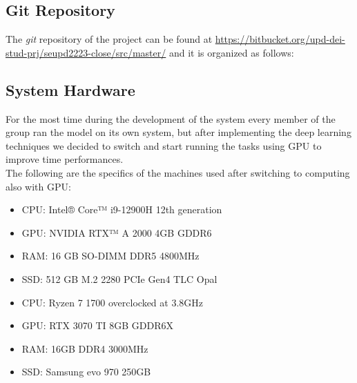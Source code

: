 \newpage
\subsection{Git Repository}
The \textit{git} repository of the project can be found at
\url{https://bitbucket.org/upd-dei-stud-prj/seupd2223-close/src/master/} and it is organized as follows:


\subsection{System Hardware}
For the most time during the development of the system every member of the group ran the model on its own system, but after implementing the deep learning techniques we decided to switch and start running the tasks using GPU to improve time performances. \\
The following are the specifics of the machines used after switching to computing also with GPU:
\begin{itemize}
	\item CPU: Intel® Core™ i9-12900H 12th generation
	\item GPU: NVIDIA RTX™ A 2000 4GB GDDR6
	\item RAM: 16 GB SO-DIMM DDR5 4800MHz
	\item SSD: 512 GB M.2 2280 PCIe Gen4 TLC Opal
\end{itemize}
\begin{itemize}
	\item CPU: Ryzen 7 1700 overclocked at 3.8GHz
	\item GPU: RTX 3070 TI 8GB GDDR6X
	\item RAM: 16GB  DDR4 3000MHz
	\item SSD: Samsung evo 970 250GB
\end{itemize}


